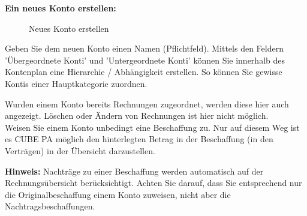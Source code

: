\vspace{\baselineskip}

\textbf{Ein neues Konto erstellen:} 

\begin{figure}[H]
\caption{Neues Konto erstellen}
\end{figure}

Geben Sie dem neuen Konto einen Namen (Pflichtfeld). Mittels den Feldern 'Übergeordnete Konti' und 'Untergeordnete Konti' können Sie innerhalb des Kontenplan eine Hierarchie / Abhängigkeit erstellen. So können Sie gewisse Kontis einer Hauptkategorie zuordnen.

\vspace{\baselineskip}

Wurden einem Konto bereits Rechnungen zugeordnet, werden diese hier auch angezeigt. Löschen oder Ändern von Rechnungen ist hier nicht möglich.\\
Weisen Sie einem Konto unbedingt eine Beschaffung zu. Nur auf diesem Weg ist es CUBE PA möglich den hinterlegten Betrag in der Beschaffung (in den Verträgen) in der Übersicht darzustellen.

\vspace{\baselineskip}

\textbf{Hinweis:} Nachträge zu einer Beschaffung werden automatisch auf der Rechnungsübersicht berücksichtigt. Achten Sie darauf, dass Sie entsprechend nur die Originalbeschaffung einem Konto zuweisen, nicht aber die Nachtragsbeschaffungen.

\vspace{\baselineskip}

